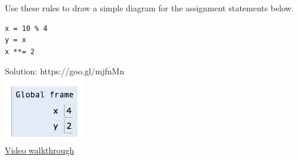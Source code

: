 \question Use these rules to draw a simple diagram for the assignment
statements below.

\begin{lstlisting}
x = 10 % 4
y = x
x **= 2
\end{lstlisting}

\begin{solution}
Solution: https://goo.gl/mjfnMn \\
\includegraphics[width=100pt]{assignment-statements.png} \\
\href{https://www.youtube.com/watch?v=rhXyTx-NkfE&list=PLx38hZJ5RLZfg6jvEBBtjc5fnc5BclyEb&index=3}{Video walkthrough}
\end{solution}

